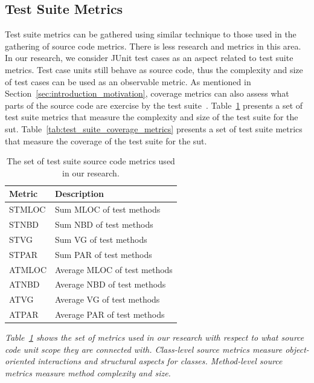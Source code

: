 \subsection{Test Suite Metrics}
\label{subsec:background_test_suite_metrics}
Test suite metrics can be gathered using similar technique to those used in the gathering of source code metrics. There is less research and metrics in this area. In our research, we consider JUnit test cases as an aspect related to test suite metrics. Test case units still behave as source code, thus the complexity and size of test cases can be used as an observable metric. As mentioned in Section~\ref{sec:introduction_motivation}, coverage metrics can also assess what parts of the source code are exercise by the test suite~\cite{ZHM97}. Table~\ref{tab:test_suite_source_metrics} presents a set of test suite metrics that measure the complexity and size of the test suite for the \gls{sut}. Table~\ref{tab:test_suite_coverage_metrics} presents a set of test suite metrics that measure the coverage of the test suite for the \gls{sut}.

\begin{table}[h]
  \centering
  \begin{tabular}{|l|l|}
    \hline
    \rowcolor[RGB]{169,196,223}
    \textbf{Metric} & \textbf{Description} \\
    \hline STMLOC & Sum MLOC of test methods \\
    \hline STNBD & Sum NBD of test methods \\
    \hline STVG & Sum VG of test methods \\
    \hline STPAR & Sum PAR of test methods \\
    \hline ATMLOC & Average MLOC of test methods \\
    \hline ATNBD & Average NBD of test methods \\
    \hline ATVG & Average VG of test methods \\
    \hline ATPAR & Average PAR of test methods \\
    \hline
  \end{tabular}
  \caption{The set of test suite source code metrics used in our research.}
  \vspace{1mm}
  \footnotesize{\emph{Table~\ref{tab:test_suite_source_metrics} shows the set of metrics used in our research with respect to what source code unit scope they are connected with. Class-level source metrics measure object-oriented interactions and structural aspects for classes. Method-level source metrics measure method complexity and size.}}
  \vspace{1mm}
  \label{tab:test_suite_source_metrics}
\end{table}

